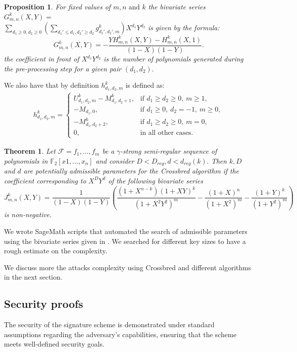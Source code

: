 \documentclass[english]{article}
\newtheorem{proposition}{Proposition}[section]
\newtheorem{theorem}{Theorem}[section]
\begin{document}
		\begin{proposition}\label{serie_G}
			For fixed values of $m, n \text{ and } k$ the bivariate series $G^{k}_{m,n}(X, Y) = $ \\ $\sum_{d_1 \geq 0, d_2 \geq 0}(\sum_{d_{1}' \leq d_1, d_{2}' \geq d_2} g_{d_{1}',d_{2}',m}^k)X^{d_1}Y^{d_2}$ is given by the formula:
			$$
				G^{k}_{m,n}(X, Y) = - \frac{YH_{m, n}^k(X,Y) - H_{m, n}^k(X, 1)}{(1-X)(1-Y)}.
			$$
			the coefficient in front of $X^{d_1}Y^{d_2}$ is the number of polynomials generated during the pre-processing step for a given pair $(d_1, d_2)$.
		\end{proposition}
		
		We also have that by definition \( h_{d_1, d_2, m}^k \) is defined as:
		\begin{align}
			h_{d_1, d_2, m}^k =
			\begin{cases}
				U_{d_1, d_2, m}^k - M_{d_1, d_2 + 1}^k, & \text{if } d_1 \geq d_2 \geq 0,\ m \geq 1, \\
				- M_{d_1, 0}, & \text{if } d_1 \geq 0,\ d_2 = -1,\ m \geq 0, \\
				- M_{d_1, d_2 + 2}^k, & \text{if } d_1 \geq d_2 \geq 0,\ m = 0, \\
				0, & \text{in all other cases}.
			\end{cases}
		\end{align}
		
		\begin{theorem}\label{serie_J}
			Let $\mathcal{F} = {f_1,\dots,f_m}$ be a $\gamma$-strong semi-regular sequence of polynomials in $\mathbb{F}_2[x1,\dots,x_n]$ and consider $D < D_{reg}, d < d_{reg}(k).$ Then $k, D$ and $d$ are potentially admissible parameters for the Crossbred algorithm if the coefficient corresponding to $X^DY^d$ of the following bivariate series
			$$
			J_{m, n}^k(X, Y) = \frac{1}{(1-X)(1-Y)}\left(\frac{(1+X^{n-k})(1+XY)^k}{(1+X^2Y^2)^m} - \frac{(1+X)^n}{(1+X^2)^m} - \frac{(1+Y)^k}{(1+Y^2)^m}\right)
			$$
			is non-negative.
		\end{theorem}
		
		We wrote SageMath scripts that automated the search of admissible parameters using the bivariate series given in \cite{VID24}. We searched for different key sizes to have a rough estimate on the complexity.
		
		We discuss more the attacks complexity using Crossbred and different algorithms in the next section.
		
		\subsection{Security proofs}
		The security of the signature scheme is demonstrated under standard assumptions regarding the adversary’s capabilities, ensuring that the scheme meets well-defined security goals.
		
\end{document}
